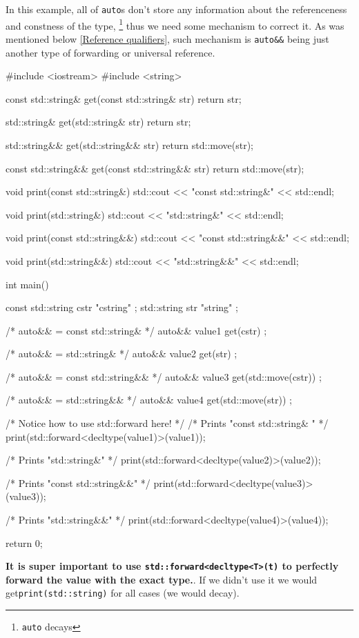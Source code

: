 \documentclass[../main]{subfiles}
\begin{document}
    In this example, all of \texttt{auto}s don't store any information about the referenceness and constness of the type,
\footnote{\texttt{auto} decays}
thus we need some mechanism to correct it.
As was mentioned below \ref{Reference qualifiers}, such mechanism is \texttt{auto\&\&} being just another type of forwarding or universal reference.
\begin{Code}
    #include <iostream>
    #include <string>
    
    const std::string& get(const std::string& str)
    {
        return str;
    }
    
    std::string& get(std::string& str)
    {
        return str;
    }
    
    std::string&& get(std::string&& str)
    {
        return std::move(str);
    }
    
    const std::string&& get(const std::string&& str)
    {
        return std::move(str);
    }
    
    void print(const std::string&)
    {
        std::cout << "const std::string&" << std::endl;
    }
    
    void print(std::string&)
    {
        std::cout << "std::string&" << std::endl;
    }
    
    void print(const std::string&&)
    {
        std::cout << "const std::string&&" << std::endl;
    }
    
    void print(std::string&&)
    {
        std::cout << "std::string&&" << std::endl;
    }
    
    int main()
    {
        const std::string cstr { "cstring" };
        std::string str { "string" };

        /* auto&& = const std::string& */
        auto&& value1 { get(cstr) };

        /* auto&& = std::string& */
        auto&& value2 { get(str) };

        /* auto&& = const std::string&& */
        auto&& value3 { get(std::move(cstr)) };

        /* auto&& = std::string&& */
        auto&& value4 { get(std::move(str)) };
        
        /* Notice how to use std::forward here! */
        /* Prints "const std::string& " */
        print(std::forward<decltype(value1)>(value1));

        /* Prints "std::string&" */
        print(std::forward<decltype(value2)>(value2));

        /* Prints "const std::string&&" */
        print(std::forward<decltype(value3)>(value3));

        /* Prints "std::string&&" */
        print(std::forward<decltype(value4)>(value4));
        
        return 0;
    }
\end{Code}
\noindent
\textbf{It is super important to use \texttt{std::forward<decltype<T>(t)} to perfectly forward the value with the exact type.}. If we didn't use it
we would get\linebreak \texttt{print(std::string)} for all cases (we would decay).\newline
\end{document}
